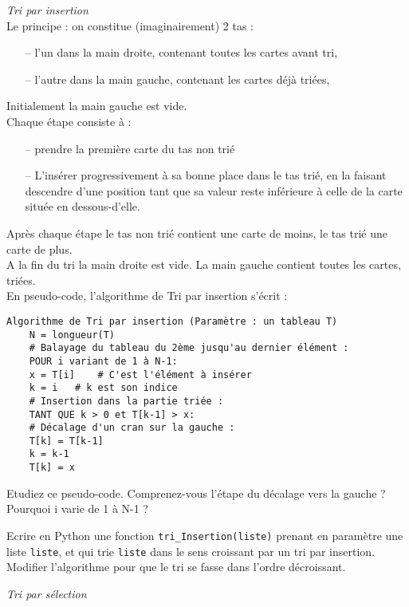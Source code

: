 \exo
\textit{Tri par insertion} \\
Le principe : on constitue (imaginairement) 2 tas : \\
\begin{enumerate}
	\item[--] l'un dans la main droite, contenant toutes les cartes avant tri,
	\item[--] l'autre dans la main gauche, contenant les cartes déjà triées,
\end{enumerate}
Initialement la main gauche est vide. \\

Chaque étape consiste à : \\
\begin{enumerate}
	\item[--] prendre la première carte du tas non trié
	\item[--] L'insérer progressivement à sa bonne place dans le tas trié, en la faisant descendre d'une position tant que sa valeur reste inférieure à celle de la carte située en dessous-d'elle.
\end{enumerate}
Après chaque étape le tas non trié contient une carte de moins, le tas trié une carte de plus.\\
A la fin du tri la main droite est vide. La main gauche contient toutes les cartes, triées. \\

\newpage
En pseudo-code, l'algorithme de Tri par insertion s'écrit :
\begin{Verbatim}[tabsize=4]
	Algorithme de Tri par insertion (Paramètre : un tableau T)
	N = longueur(T)
	# Balayage du tableau du 2ème jusqu'au dernier élément :
	POUR i variant de 1 à N-1:
	x = T[i] 	# C'est l'élément à insérer
	k = i 	# k est son indice
	# Insertion dans la partie triée :
	TANT QUE k > 0 et T[k-1] > x:
	# Décalage d'un cran sur la gauche :
	T[k] = T[k-1]
	k = k-1
	T[k] = x
\end{Verbatim}

\ques Etudiez ce pseudo-code. Comprenez-vous l'étape du décalage vers la gauche ? Pourquoi i varie de 1 à N-1 ?

\ques Ecrire en Python une fonction \texttt{tri\_Insertion(liste)} prenant en paramètre une liste \texttt{liste}, et qui trie \texttt{liste} dans le sens croissant par un tri par insertion.
 Modifier l'algorithme pour que le tri se fasse dans l'ordre décroissant.

\exo
\textit{Tri par sélection}

